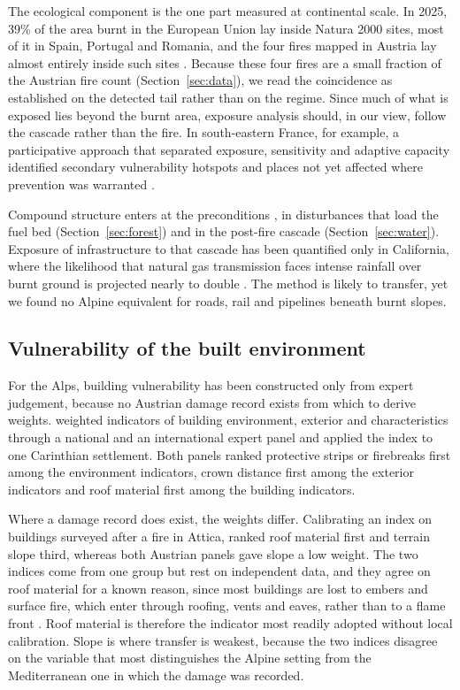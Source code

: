 \documentclass[11pt,a4paper]{article}
\begin{document}
The ecological component is the one part measured at continental scale. In 2025, 39\% of the area burnt in the European Union lay inside Natura 2000 sites, most of it in Spain, Portugal and Romania, and the four fires mapped in Austria lay almost entirely inside such sites \citep{jrc_advance_2026}. Because these four fires are a small fraction of the Austrian fire count (Section~\ref{sec:data}), we read the coincidence as established on the detected tail rather than on the regime. Since much of what is exposed lies beyond the burnt area, exposure analysis should, in our view, follow the cascade rather than the fire. In south-eastern France, for example, a participative approach that separated exposure, sensitivity and adaptive capacity identified secondary vulnerability hotspots and places not yet affected where prevention was warranted \citep{riviere_mapping_2023}.

Compound structure enters at the preconditions \citep{miller_compounding_2025}, in disturbances that load the fuel bed \citep{bebi_changes_2017} (Section~\ref{sec:forest}) and in the post-fire cascade (Section~\ref{sec:water}). Exposure of infrastructure to that cascade has been quantified only in California, where the likelihood that natural gas transmission faces intense rainfall over burnt ground is projected nearly to double \citep{moftakhari_increasing_2019}. The method is likely to transfer, yet we found no Alpine equivalent for roads, rail and pipelines beneath burnt slopes.

\subsection{Vulnerability of the built environment}

For the Alps, building vulnerability has been constructed only from expert judgement, because no Austrian damage record exists from which to derive weights. \citet{papathomakohle_towards_2025} weighted indicators of building environment, exterior and characteristics through a national and an international expert panel and applied the index to one Carinthian settlement. Both panels ranked protective strips or firebreaks first among the environment indicators, crown distance first among the exterior indicators and roof material first among the building indicators.

Where a damage record does exist, the weights differ. Calibrating an index on buildings surveyed after a fire in Attica, \citet{papathomakohle_wildfire_2022} ranked roof material first and terrain slope third, whereas both Austrian panels gave slope a low weight. The two indices come from one group but rest on independent data, and they agree on roof material for a known reason, since most buildings are lost to embers and surface fire, which enter through roofing, vents and eaves, rather than to a flame front \citep{naser_vulnerability_2025}. Roof material is therefore the indicator most readily adopted without local calibration. Slope is where transfer is weakest, because the two indices disagree on the variable that most distinguishes the Alpine setting from the Mediterranean one in which the damage was recorded.
\end{document}
